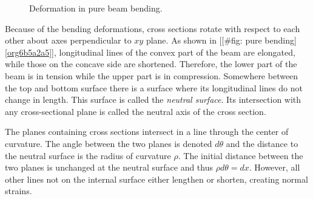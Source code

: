\documentclass[a4paper,openany,12pt]{book}
\begin{document}
\begin{figure}[h]
  \centering
  \caption{Deformation in pure beam bending.}
\end{figure}

Because of the bending deformations, cross sections rotate with respect
to each other about axes perpendicular to \(xy\) plane. As shown in
[[\#fig: pure bending]\ref{org6b5a2a5}], longitudinal lines of the
convex part of the beam are elongated, while those on the concave side
are shortened. Therefore, the lower part of the beam is in tension while
the upper part is in compression. Somewhere between the top and bottom
surface there is a surface where its longitudinal lines do not change in
length. This surface is called the \emph{neutral surface}. Its intersection
with any cross-sectional plane is called the neutral axis of the cross
section.

The planes containing cross sections intersect in a line through the
center of curvature. The angle between the two planes is denoted
\(d\theta\) and the distance to the neutral surface is the radius of
curvature \(\rho\). The initial distance between the two planes is
unchanged at the neutral surface and thus \(\rho d \theta = dx\). However,
all other lines not on the internal surface either lengthen or shorten,
creating normal strains.
\end{document}
